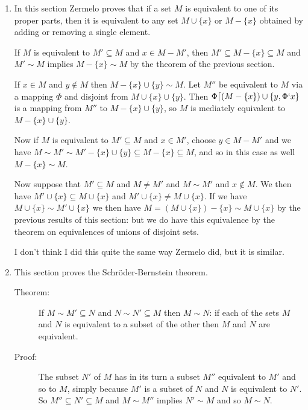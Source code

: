 \documentclass[12pt]{article}
\begin{document}
\begin{enumerate}
\item  In this section Zermelo proves that if a set $M$ is equivalent to one of its proper parts, then it is equivalent to any set $M \cup \{x\}$ or $M - \{x\}$ obtained by adding
or removing a single element.

If $M$ is equivalent to $M' \subseteq M$ and $x \in M - M'$, then $M' \subseteq M - \{x\} \subseteq M$ and $M' \sim M$ implies $M - \{x\} \sim M$ by the theorem of the previous section.

If $x\in M$ and $y \not\in M$ then $M -\{x\} \cup \{y\} \sim M$.  Let $M''$ be equivalent to $M$ via a mapping $\Phi$ and disjoint from $M \cup \{x\} \cup \{y\}$.
Then $\Phi \lceil (M - \{x\}) \cup \{y,\Phi`x\}$ is a mapping from $M''$ to $M -\{x\}\cup \{y\}$, so $M$ is mediately equivalent to $M -\{x\} \cup \{y\}$.

Now if $M$ is equivalent to $M' \subseteq M$ and $x \in M'$, choose $y \in M-M'$ and we have $M \sim M' \sim M'-\{x\}\cup \{y\} \subseteq M-\{x\} \subseteq M$, and so
in this case as well $M-\{x\} \sim M$.

Now suppose that $M' \subseteq M$ and $M \neq M'$ and $M \sim M'$ and $x \not\in M$.  We then have $M' \cup \{x\} \subseteq M \cup \{x\}$ and $M' \cup \{x\} \neq M \cup \{x\}$.
If we have $M \cup \{x\} \sim M'\cup \{x\}$ we then have $M = (M \cup \{x\}) - \{x\} \sim M \cup \{x\}$ by the previous results of this section:  but we do have this equivalence
by the theorem on equivalences of unions of disjoint sets.

I don't think I did this quite the same way Zermelo did, but it is similar.

\item This section proves the Schr\"oder-Bernstein theorem.

\begin{description}

\item[Theorem:]  If $M \sim M' \subseteq N$ and $N \sim N'\subseteq M$ then $M \sim N$:  if each of the sets $M$ and $N$ is equivalent to a subset of the other then
$M$ and $N$ are equivalent.

\item[Proof:]  The subset $N'$ of $M$ has in its turn a subset $M''$ equivalent to $M'$ and so to $M$, simply because $M'$ is a subset of $N$ and $N$ is equivalent to $N'$.
So $M'' \subseteq N' \subseteq M$ and $M \sim M''$ implies $N' \sim M$ and so $M \sim N$.



\end{description}



\end{enumerate}
\end{document}
